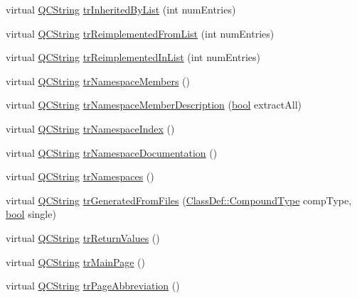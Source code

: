 \begin{DoxyCompactItemize}
virtual \hyperlink{class_q_c_string}{Q\+C\+String} \hyperlink{class_translator_persian_a29b16a0819f20f9d5c4afa710a45b98b}{tr\+Inherited\+By\+List} (int num\+Entries)
\item 
virtual \hyperlink{class_q_c_string}{Q\+C\+String} \hyperlink{class_translator_persian_a41187ae168e667bf16d5b10d23930781}{tr\+Reimplemented\+From\+List} (int num\+Entries)
\item 
virtual \hyperlink{class_q_c_string}{Q\+C\+String} \hyperlink{class_translator_persian_abb546b81293c52326fc04cc2b7fee8d9}{tr\+Reimplemented\+In\+List} (int num\+Entries)
\item 
virtual \hyperlink{class_q_c_string}{Q\+C\+String} \hyperlink{class_translator_persian_a6d2cec6e6b01c46c98f3ae04c11e8ebf}{tr\+Namespace\+Members} ()
\item 
virtual \hyperlink{class_q_c_string}{Q\+C\+String} \hyperlink{class_translator_persian_aacd921c664d9b611943e1fb8ee5a3fed}{tr\+Namespace\+Member\+Description} (\hyperlink{qglobal_8h_a1062901a7428fdd9c7f180f5e01ea056}{bool} extract\+All)
\item 
virtual \hyperlink{class_q_c_string}{Q\+C\+String} \hyperlink{class_translator_persian_afcea2a6f3a94aac26b3217a4b612a3ff}{tr\+Namespace\+Index} ()
\item 
virtual \hyperlink{class_q_c_string}{Q\+C\+String} \hyperlink{class_translator_persian_ac2179ab0c1d7e3cce5f0d01a246ef087}{tr\+Namespace\+Documentation} ()
\item 
virtual \hyperlink{class_q_c_string}{Q\+C\+String} \hyperlink{class_translator_persian_a7c36286e4a3e5757a078b0ebb79f549d}{tr\+Namespaces} ()
\item 
virtual \hyperlink{class_q_c_string}{Q\+C\+String} \hyperlink{class_translator_persian_a327cf9ca691ef8e92366a68927501dfa}{tr\+Generated\+From\+Files} (\hyperlink{class_class_def_ae70cf86d35fe954a94c566fbcfc87939}{Class\+Def\+::\+Compound\+Type} comp\+Type, \hyperlink{qglobal_8h_a1062901a7428fdd9c7f180f5e01ea056}{bool} single)
\item 
virtual \hyperlink{class_q_c_string}{Q\+C\+String} \hyperlink{class_translator_persian_ab606a7adc649c6915c84e55bc222cb77}{tr\+Return\+Values} ()
\item 
virtual \hyperlink{class_q_c_string}{Q\+C\+String} \hyperlink{class_translator_persian_ac338f79be2c8e48f92360ea8c4c649d9}{tr\+Main\+Page} ()
\item 
virtual \hyperlink{class_q_c_string}{Q\+C\+String} \hyperlink{class_translator_persian_aa8ad3161043decd8a31b14be69f42947}{tr\+Page\+Abbreviation} ()

\end{DoxyCompactItemize}
